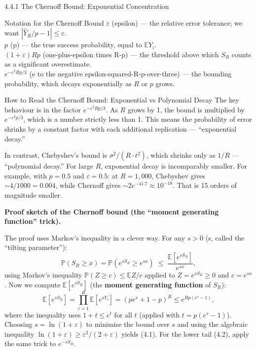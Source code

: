 \documentclass[aspectratio=169,10pt]{beamer}
\begin{document}
\begin{frame}[allowframebreaks]{4.4.1 The Chernoff Bound: Exponential Concentration}
\begin{block}{Notation for the Chernoff Bound}
  $\varepsilon$ (epsilon) --- the relative error tolerance; we want
  $|\hat{Y}_R/p - 1| \leq \varepsilon$.\\[4pt]
  $p$ (p) --- the true success probability, equal to $\mathbb{E}Y_i$.\\[4pt]
  $(1+\varepsilon)Rp$ (one-plus-epsilon times R-p) --- the threshold
  above which $S_R$ counts as a significant overestimate.\\[4pt]
  $e^{-\varepsilon^2 Rp/3}$ (e to the negative epsilon-squared-R-p-over-three) ---
  the bounding probability, which decays exponentially as $R$ or $p$ grows.
\end{block}

\framebreak

\begin{alertblock}{How to Read the Chernoff Bound: Exponential vs Polynomial Decay}
  The key behaviour is in the factor $e^{-\varepsilon^2 Rp/3}$.  As $R$ grows by 1,
  the bound is multiplied by $e^{-\varepsilon^2 p/3}$, which is a number strictly
  less than 1.  This means the probability of error shrinks by a constant factor
  with each additional replication --- ``exponential decay.''

  In contrast, Chebyshev's bound is $\sigma^2/(R \cdot t^2)$, which shrinks only as
  $1/R$ --- ``polynomial decay.''  For large $R$, exponential decay is
  incomparably smaller.  For example, with $p = 0.5$ and $\varepsilon = 0.5$:
  at $R = 1{,}000$, Chebyshev gives $\sim 4/1000 = 0.004$, while Chernoff gives
  $\sim 2e^{-41.7} \approx 10^{-18}$.  That is 15 orders of magnitude smaller.
\end{alertblock}

\textbf{Proof sketch of the Chernoff bound (the ``moment generating function'' trick).}

The proof uses Markov's inequality in a clever way.  For any $s > 0$ (s, called
the ``tilting parameter''):
\[
  \mathbb{P}(S_R \geq x) = \mathbb{P}(e^{sS_R} \geq e^{sx})
  \;\leq\; \frac{\mathbb{E}[e^{sS_R}]}{e^{sx}},
\]
using Markov's inequality $\mathbb{P}(Z \geq c) \leq \mathbb{E}Z/c$ applied to
$Z = e^{sS_R} \geq 0$ and $c = e^{sx}$.  Now we compute $\mathbb{E}[e^{sS_R}]$
(the \textbf{moment generating function} of $S_R$):
\[
  \mathbb{E}[e^{sS_R}] = \prod_{i=1}^R \mathbb{E}[e^{sY_i}]
  = (pe^s + 1-p)^R
  \leq e^{Rp(e^s - 1)},
\]
where the inequality uses $1 + t \leq e^t$ for all $t$ (applied with $t = p(e^s-1)$).
Choosing $s = \ln(1+\varepsilon)$ to minimise the bound over $s$ and using the
algebraic inequality $\ln(1+\varepsilon) \geq \varepsilon^2/(2+\varepsilon)$
yields (4.1).  For the lower tail (4.2), apply the same trick to $e^{-sS_R}$.


\end{frame}
\end{document}
